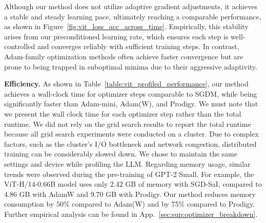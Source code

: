 Although our method does not utilize adaptive gradient adjustments, it achieves a stable and steady learning pace, ultimately reaching a comparable performance, as shown in Figure~\ref{fig:vit_loss_acc_across_time}. Empirically, this stability arises from our preconditioned learning rate, which ensures each step is well-controlled and converges reliably with sufficient training steps. In contrast, Adam-family optimization methods often achieve faster convergence but are prone to being trapped in suboptimal minima due to their aggressive adaptivity.

\textbf{Efficiency.} 
As shown in Table~\ref{table:vit_profiled_performance}, our method achieves a wall-clock time for optimizer steps comparable to SGDM, while being significantly faster than Adam-mini, Adam(W), and Prodigy. We must note that we present the wall clock time for each optimizer step rather than the total runtime. We did not rely on the grid search results to report the total runtime because all grid search experiments were conducted on a cluster. Due to complex factors, such as the cluster's I/O bottleneck and network congestion, distributed training can be considerably slowed down. We chose to maintain the same settings and device while profiling the LLM. Regarding memory usage, similar trends were observed during the pre-training of GPT-2 Small. For example, the ViT-H/14-0.66B model uses only 2.42 GB of memory with SGD-SaI, compared to 4.86 GB with AdamW and 9.70 GB with Prodigy. Our method reduces memory consumption by 50\% compared to Adam(W) and by 75\% compared to Prodigy. Further empirical analysis can be found in App.~\ref{sec:sup:optimizer_breakdown}.

